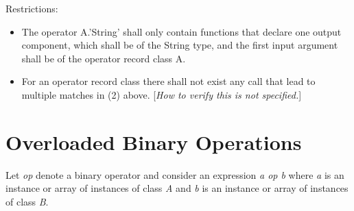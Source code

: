 \documentclass[10pt,a4paper]{report}
\def\doublelabel#1{\label{#1}\hypertarget{#1}{}}
\begin{document}
Restrictions:

\begin{itemize}
\item
  The operator A.'String' shall only contain functions that declare one
  output component, which shall be of the String type, and the first
  input argument shall be of the operator record class A.
\item
  For an operator record class there shall not exist any call that lead
  to multiple matches in (2) above. {[}\emph{How to verify this is not
  specified.}{]}
\end{itemize}

\section{Overloaded Binary Operations}\doublelabel{overloaded-binary-operations}

Let \emph{op} denote a binary operator and consider an expression
\emph{a op b} where \emph{a} is an instance or array of instances of
class \emph{A} and \emph{b} is an instance or array of instances of
class \emph{B}.
\end{document}
